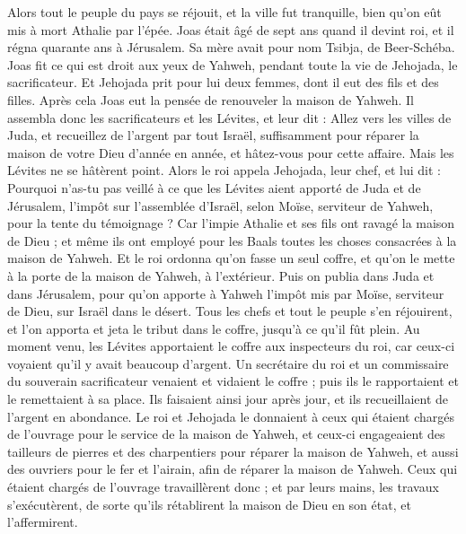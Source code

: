 \begin{multicols}{2}
Alors tout le peuple du pays se réjouit, et la ville fut tranquille, bien qu'on eût mis à mort Athalie par l'épée.
\VerseOne{}Joas était âgé de sept ans quand il devint roi, et il régna quarante ans à Jérusalem. Sa mère avait pour nom Tsibja, de Beer-Schéba.
Joas fit ce qui est droit aux yeux de Yahweh, pendant toute la vie de Jehojada, le sacrificateur.
Et Jehojada prit pour lui deux femmes, dont il eut des fils et des filles.
Après cela Joas eut la pensée de renouveler la maison de Yahweh.
Il assembla donc les sacrificateurs et les Lévites, et leur dit : Allez vers les villes de Juda, et recueillez de l'argent par tout Israël, suffisamment pour réparer la maison de votre Dieu d'année en année, et hâtez-vous pour cette affaire. Mais les Lévites ne se hâtèrent point.
Alors le roi appela Jehojada, leur chef, et lui dit : Pourquoi n'as-tu pas veillé à ce que les Lévites aient apporté de Juda et de Jérusalem, l'impôt sur l'assemblée d'Israël, selon Moïse, serviteur de Yahweh, pour la tente du témoignage ?
Car l'impie Athalie et ses fils ont ravagé la maison de Dieu ; et même ils ont employé pour les Baals toutes les choses consacrées à la maison de Yahweh.
Et le roi ordonna qu'on fasse un seul coffre, et qu'on le mette à la porte de la maison de Yahweh, à l'extérieur.
Puis on publia dans Juda et dans Jérusalem, pour qu'on apporte à Yahweh l'impôt mis par Moïse, serviteur de Dieu, sur Israël dans le désert.
Tous les chefs et tout le peuple s'en réjouirent, et l'on apporta et jeta le tribut dans le coffre, jusqu'à ce qu'il fût plein.
Au moment venu, les Lévites apportaient le coffre aux inspecteurs du roi, car ceux-ci voyaient qu'il y avait beaucoup d'argent. Un secrétaire du roi et un commissaire du souverain sacrificateur venaient et vidaient le coffre ; puis ils le rapportaient et le remettaient à sa place. Ils faisaient ainsi jour après jour, et ils recueillaient de l'argent en abondance.
Le roi et Jehojada le donnaient à ceux qui étaient chargés de l'ouvrage pour le service de la maison de Yahweh, et ceux-ci engageaient des tailleurs de pierres et des charpentiers pour réparer la maison de Yahweh, et aussi des ouvriers pour le fer et l'airain, afin de réparer la maison de Yahweh.
Ceux qui étaient chargés de l'ouvrage travaillèrent donc ; et par leurs mains, les travaux s'exécutèrent, de sorte qu'ils rétablirent la maison de Dieu en son état, et l'affermirent.

\end{multicols}
